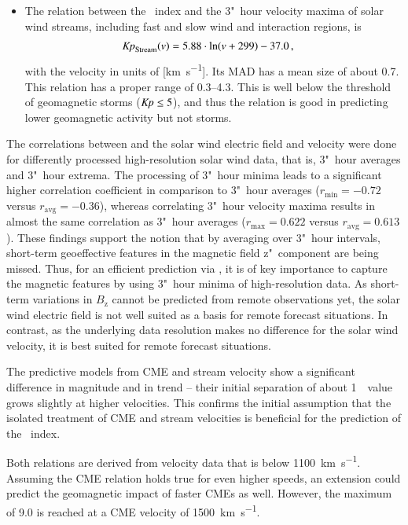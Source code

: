 \begin{itemize}
	\item The relation between the \Kp~index and the 3"~hour velocity maxima of solar wind streams, including fast and slow wind and interaction regions, is
	\begin{align*}
		\text{\Kp}_\text{Stream}(v) &= 5.88 \cdot \ln(v + 299) - 37.0	\,,
	\end{align*}
	with the velocity in units of [\si{\km\per\s}]. Its MAD has a mean \Kp{} size of about \num{0.7}. This relation has a proper \Kp{} range of \numrange{0.3}{4.3}. This is well below the threshold of geomagnetic storms ($\si{\Kp} \leq 5$), and thus the relation is good in predicting lower geomagnetic activity but not storms.
\end{itemize}

\bigskip

The correlations between \Kp{} and the solar wind electric field and velocity were done for differently processed high-resolution solar wind data, that is, 3"~hour averages and 3"~hour extrema. The processing of 3"~hour \vBz{} minima leads to a significant higher correlation coefficient in comparison to 3"~hour averages ($r_\text{min} = -0.72$ versus $r_\text{avg} = -0.36$), whereas correlating 3"~hour velocity maxima results in almost the same correlation as 3"~hour averages ($r_\text{max} = 0.622$ versus $r_\text{avg} = 0.613$).
These findings support the notion that by averaging over 3"~hour intervals, short-term geoeffective features in the magnetic field z"~component are being missed. Thus, for an efficient \Kp{} prediction via \vBz{}, it is of key importance to capture the magnetic features by using 3"~hour minima of high-resolution data. As short-term variations in $B_\text{z}$ cannot be predicted from remote observations yet, the solar wind electric field is not well suited as a basis for remote forecast situations.
In contrast, as the underlying data resolution makes no difference for the solar wind velocity, it is best suited for remote forecast situations.

The \Kp{} predictive models from CME and stream velocity show a significant difference in magnitude and in trend -- their initial separation of about 1~\Kp~value grows slightly at higher velocities. This confirms the initial assumption that the isolated treatment of CME and stream velocities is beneficial for the prediction of the \Kp~index.

Both relations are derived from velocity data that is below \SI{1100}{\km\per\s}. Assuming the CME relation holds true for even higher speeds, an extension could predict the geomagnetic impact of faster CMEs as well. However, the maximum \Kp{} of \num{9.0} is reached at a CME velocity of \SI{1500}{\km\per\s}.

